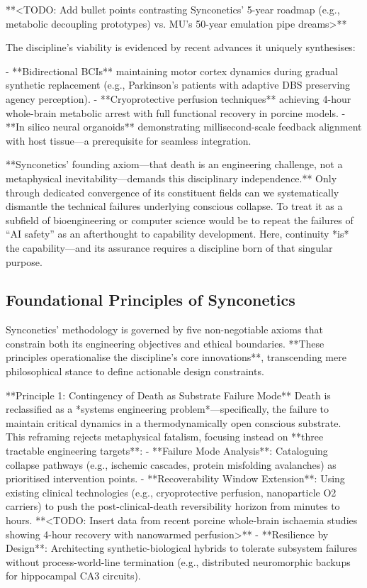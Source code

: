 \documentclass[10pt]{article}
\begin{document}
\begin{sloppypar}
  **<TODO: Add bullet points contrasting Synconetics’ 5-year roadmap (e.g., metabolic decoupling prototypes) vs. MU’s 50-year emulation pipe dreams>**

  The discipline’s viability is evidenced by recent advances it uniquely synthesises:

  - **Bidirectional BCIs** maintaining motor cortex dynamics during gradual synthetic replacement (e.g., Parkinson’s patients with adaptive DBS preserving agency perception).
  - **Cryoprotective perfusion techniques** achieving 4-hour whole-brain metabolic arrest with full functional recovery in porcine models.
  - **In silico neural organoids** demonstrating millisecond-scale feedback alignment with host tissue—a prerequisite for seamless integration.

  **Synconetics’ founding axiom—that death is an engineering challenge, not a metaphysical inevitability—demands this disciplinary independence.** Only through dedicated convergence of its constituent fields can we systematically dismantle the technical failures underlying conscious collapse. To treat it as a subfield of bioengineering or computer science would be to repeat the failures of “AI safety” as an afterthought to capability development. Here, continuity *is* the capability—and its assurance requires a discipline born of that singular purpose.

  \subsection{Foundational Principles of Synconetics}
  \label{sec:foundational-principles}

  Synconetics’ methodology is governed by five non-negotiable axioms that constrain both its engineering objectives and ethical boundaries. **These principles operationalise the discipline’s core innovations**, transcending mere philosophical stance to define actionable design constraints.

  **Principle 1: Contingency of Death as Substrate Failure Mode**
  Death is reclassified as a *systems engineering problem*—specifically, the failure to maintain critical dynamics in a thermodynamically open conscious substrate. This reframing rejects metaphysical fatalism, focusing instead on **three tractable engineering targets**:
  - **Failure Mode Analysis**: Cataloguing collapse pathways (e.g., ischemic cascades, protein misfolding avalanches) as prioritised intervention points.
  - **Recoverability Window Extension**: Using existing clinical technologies (e.g., cryoprotective perfusion, nanoparticle O2 carriers) to push the post-clinical-death reversibility horizon from minutes to hours. **<TODO: Insert data from recent porcine whole-brain ischaemia studies showing 4-hour recovery with nanowarmed perfusion>**
  - **Resilience by Design**: Architecting synthetic-biological hybrids to tolerate subsystem failures without process-world-line termination (e.g., distributed neuromorphic backups for hippocampal CA3 circuits).


\end{sloppypar}
\end{document}
